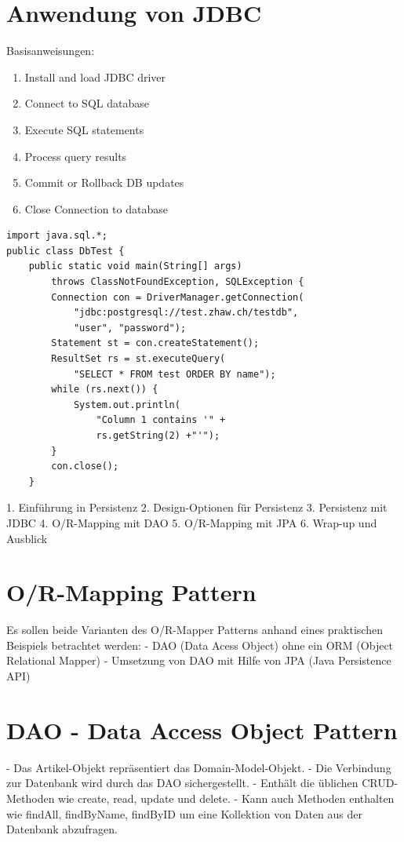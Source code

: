 \section*{Anwendung von JDBC}
Basisanweisungen:

\begin{enumerate}
  \item Install and load JDBC driver
  \item Connect to SQL database
  \item Execute SQL statements
  \item Process query results
  \item Commit or Rollback DB updates
  \item Close Connection to database
\end{enumerate}

\begin{verbatim}
import java.sql.*;
public class DbTest {
    public static void main(String[] args)
        throws ClassNotFoundException, SQLException {
        Connection con = DriverManager.getConnection(
            "jdbc:postgresql://test.zhaw.ch/testdb",
            "user", "password");
        Statement st = con.createStatement();
        ResultSet rs = st.executeQuery(
            "SELECT * FROM test ORDER BY name");
        while (rs.next()) {
            System.out.println(
                "Column 1 contains '" +
                rs.getString(2) +"'");
        }
        con.close();
    }

  \end{verbatim}

1. Einführung in Persistenz
2. Design-Optionen für Persistenz
3. Persistenz mit JDBC
4. O/R-Mapping mit DAO
5. O/R-Mapping mit JPA
6. Wrap-up und Ausblick

\section*{O/R-Mapping Pattern}

Es sollen beide Varianten des O/R-Mapper Patterns anhand eines praktischen Beispiels betrachtet werden:
- DAO (Data Acess Object) ohne ein ORM (Object Relational Mapper)
- Umsetzung von DAO mit Hilfe von JPA (Java Persistence API)

\section*{DAO - Data Access Object Pattern}
- Das Artikel-Objekt repräsentiert das Domain-Model-Objekt.
- Die Verbindung zur Datenbank wird durch das DAO sichergestellt.
- Enthält die üblichen CRUD-Methoden wie create, read, update und delete.
- Kann auch Methoden enthalten wie findAll, findByName, findByID um eine Kollektion von Daten aus der Datenbank abzufragen.

